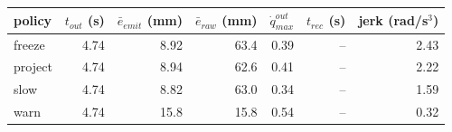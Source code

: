 \begin{tabular}{lrrrrrr}
\toprule
policy & $t_{out}$ (s) & $\bar{e}_{emit}$ (mm) & $\bar{e}_{raw}$ (mm) & $\dot{q}_{max}^{out}$ & $t_{rec}$ (s) & jerk (rad/s$^3$) \\
\midrule
freeze & 4.74 & 8.92 & 63.4 & 0.39 & -- & 2.43 \\
project & 4.74 & 8.94 & 62.6 & 0.41 & -- & 2.22 \\
slow & 4.74 & 8.82 & 63.0 & 0.34 & -- & 1.59 \\
warn & 4.74 & 15.8 & 15.8 & 0.54 & -- & 0.32 \\
\bottomrule
\end{tabular}
